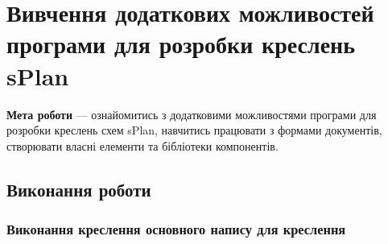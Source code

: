 \chapter[~]{Вивчення додаткових можливостей програми для розробки креслень sPlan}

\textbf{Мета роботи} --- ознайомитись з додатковими можливостями програми для розробки креслень схем
sPlan, навчитись працювати з формами документів, створювати власні елементи та бібліотеки
компонентів.

\section{Виконання роботи}
\subsection{Виконання креслення основного напису для креслення}

